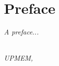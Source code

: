\chapter*{Preface}

\emph{A preface...}

\begin{flushright}
{\makeatletter\itshape
    \@author \\
    UPMEM, \monthname{} \the\year{}
\makeatother}
\end{flushright}
